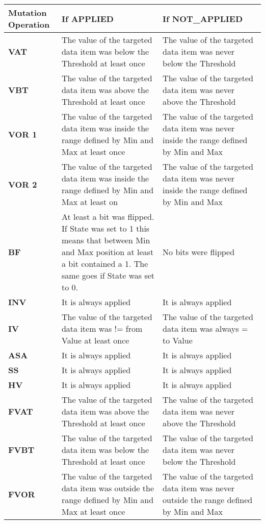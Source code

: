 \begin{table}[]
\begin{tabular}{|l|l|l|}
\hline
\textbf{Mutation Operation} & \textbf{If APPLIED} & \textbf{If NOT\_APPLIED} \\ \hline
\textbf{VAT} & The value of the targeted data item was below the Threshold at least once & The value of the targeted data item was never below the Threshold \\ \hline
\textbf{VBT} & The value of the targeted data item was above the Threshold at least once & The value of the targeted data item was never above the Threshold \\ \hline
\textbf{VOR 1} & The value of the targeted data item was inside the range defined by Min and Max at least once & The value of the targeted data item was never inside the range defined by Min and Max \\ \hline
\textbf{VOR 2} & The value of the targeted data item was inside the range defined by Min and Max at least on & The value of the targeted data item was never inside the range defined by Min and Max \\ \hline
\textbf{BF} & At least a bit was flipped. If State was set to 1 this means that between Min and Max position at least a bit contained a 1. The same goes if State was set to 0. & No bits were flipped \\ \hline
\textbf{INV} & It is always applied & It is always applied \\ \hline
\textbf{IV} & The value of the targeted data item was != from Value at least once & The value of the targeted data item was always = to Value \\ \hline
\textbf{ASA} & It is always applied & It is always applied \\ \hline
\textbf{SS} & It is always applied & It is always applied \\ \hline
\textbf{HV} & It is always applied & It is always applied \\ \hline
\textbf{FVAT} & The value of the targeted data item was above the Threshold at least once & The value of the targeted data item was never above the Threshold \\ \hline
\textbf{FVBT} & The value of the targeted data item was below the Threshold at least once & The value of the targeted data item was never below the Threshold \\ \hline
\textbf{FVOR} & The value of the targeted data item was outside the range defined by Min and Max at least once & The value of the targeted data item was never outside the range defined by Min and Max \\ \hline
\end{tabular}
\end{table}
